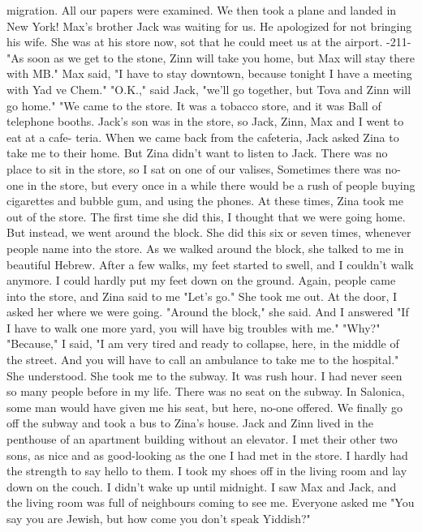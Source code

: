 migration.
All our papers were examined.
We then took a plane and landed in New York!
Max's brother Jack was waiting for us.
He apologized for 
not bringing his wife.
She was at his store now, sot that he could meet
us at the airport.
-211- 
"As soon as we get to the stone, Zinn will take you home, but Max will stay there 
with MB."
Max said, "I have to stay downtown, because tonight I have a meeting with Yad ve 
Chem."
"O.K.," said Jack, "we'll go together, but Tova and Zinn will go home."
"We came to the store.
It was a tobacco store, and it was Ball of telephone 
booths.
Jack's son was in the store, so Jack, Zinn, Max and I went to eat at a cafe-
teria.
When we came back from the cafeteria, Jack asked Zina to take me to their 
home.
But Zina didn't want to listen to Jack.
There was no place to sit in the store, 
so I sat on one of our valises, Sometimes there was no-one in the store, but every 
once in a while there would be a rush of people buying cigarettes and bubble gum, and 
using the phones.
At these times, Zina took me out of the store.
The first time she did this, I thought that we were going home.
But instead, we 
went around the block.
She did this six or seven times, whenever people name into the 
store.
As we walked around the block, she talked to me in beautiful Hebrew.
After a 
few walks, my feet started to swell, and I couldn't walk anymore.
I could hardly 
put my feet down on the ground.
Again, people came into the store, and Zina said to 
me "Let's go."
She took me out.
At the door, I asked her where we were going.
"Around the 
block," she said.
And I answered "If I have to walk one more yard, you will have big troubles with 
me."
"Why?"
"Because," I said, "I am very tired and ready to collapse, here, in the middle of 
the street.
And you will have to call an ambulance to take me to the hospital."
She understood.
She took me to the subway.
It was rush hour.
I had never seen 
so many people before in my life.
There was no seat on the subway.
In Salonica, some 
man would have given me his seat, but here, no-one offered.
We finally go off the 
subway and took a bus to Zina's house.
Jack and Zinn lived in the penthouse of an apartment building without an elevator.
I met their other two sons, as nice and as good-looking as the one I 
had met in the store.
I hardly had the strength to say hello to them.
I took my 
shoes off in the living room and lay down on the couch.
I didn't wake up until midnight.
I saw Max and Jack, and the living room was full of neighbours coming to
see me.
Everyone asked me "You say you are Jewish, but how come you don't speak Yiddish?"

